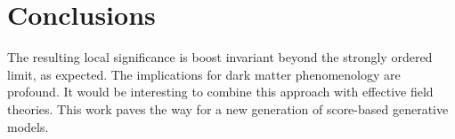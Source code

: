 \section{Conclusions}\label{sec:conclusions}

The resulting local significance is boost invariant beyond the strongly
ordered limit, as expected. The implications for dark matter
phenomenology are profound. It would be interesting to combine this
approach with effective field theories. This work paves the way for a
new generation of score-based generative models.

